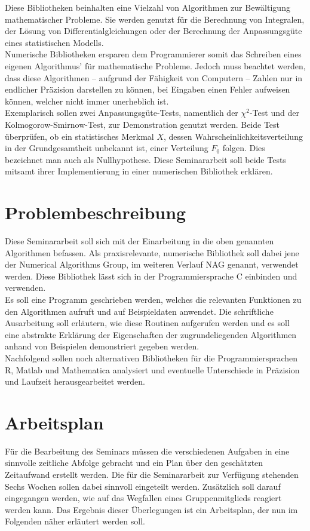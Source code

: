 \documentclass{article}
\begin{document}
Diese Bibliotheken beinhalten eine Vielzahl von Algorithmen zur Bewältigung mathematischer Probleme. Sie werden genutzt für die Berechnung von Integralen, der Lösung von Differentialgleichungen oder der Berechnung der Anpassungsgüte eines statistischen Modells.\\
Numerische Bibliotheken ersparen dem Programmierer somit das Schreiben eines eigenen Algorithmus' für mathematische Probleme. Jedoch muss beachtet werden, dass diese Algorithmen -- aufgrund der Fähigkeit von Computern -- Zahlen nur in endlicher Präzision darstellen zu können, bei Eingaben einen Fehler aufweisen können, welcher nicht immer unerheblich ist.\\
Exemplarisch sollen zwei Anpassungsgüte-Tests, namentlich der $\chi^2$-Test und der Kolmogorow-Smirnow-Test, zur Demonstration genutzt werden.
Beide Test überprüfen, ob ein statistisches Merkmal $X$, dessen Wahrscheinlichkeitsverteilung in der Grundgesamtheit unbekannt ist, einer Verteilung $F_0$ folgen. Dies bezeichnet man auch als Nullhypothese.
Diese Seminararbeit soll beide Tests mitsamt ihrer Implementierung in einer numerischen Bibliothek erklären.

\section{Problembeschreibung}
Diese Seminararbeit soll sich mit der Einarbeitung in die oben genannten Algorithmen befassen.
Als praxisrelevante, numerische Bibliothek soll dabei jene der Numerical Algorithms Group, im weiteren Verlauf NAG genannt, verwendet werden. Diese Bibliothek lässt sich in der Programmiersprache C einbinden und verwenden.\\
Es soll eine Programm geschrieben werden, welches die relevanten Funktionen zu den Algorithmen aufruft und auf Beispieldaten anwendet. Die schriftliche Ausarbeitung soll erläutern, wie diese Routinen aufgerufen werden und es soll eine abstrakte Erklärung der Eigenschaften der zugrundeliegenden Algorithmen anhand von Beispielen demonstriert gegeben werden.\\
Nachfolgend sollen noch alternativen Bibliotheken für die Programmiersprachen R, Matlab und Mathematica analysiert und eventuelle Unterschiede in Präzision und Laufzeit herausgearbeitet werden.

\section{Arbeitsplan}
Für die Bearbeitung des Seminars müssen die verschiedenen Aufgaben in eine sinnvolle zeitliche Abfolge gebracht und ein Plan über den geschätzten Zeitaufwand erstellt werden.
Die für die Seminararbeit zur Verfügung stehenden Sechs Wochen sollen dabei sinnvoll eingeteilt werden.
Zusätzlich soll darauf eingegangen werden, wie auf das Wegfallen eines Gruppenmitglieds reagiert werden kann.
Das Ergebnis dieser Überlegungen ist ein Arbeitsplan, der nun im Folgenden näher erläutert werden soll.
\end{document}
